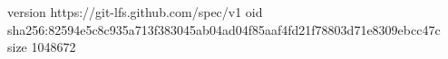 version https://git-lfs.github.com/spec/v1
oid sha256:82594e5c8c935a713f383045ab04ad04f85aaf4fd21f78803d71e8309ebcc47c
size 1048672

